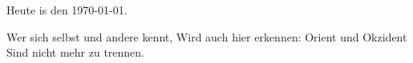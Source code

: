 \documentclass{minimal}
\begin{document}
Heute is den \today.

\begin{minipage}{1pt}
Wer sich selbst und andere kennt,
Wird auch hier erkennen:
Orient und Okzident
Sind nicht mehr zu trennen.
\end{minipage}
\end{document}
